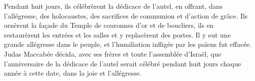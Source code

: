 Pendant huit jours, ils célébrèrent la dédicace de l’autel,
	en offrant, dans l’allégresse, des holocaustes,
		des sacrifices de communion et d’action de grâce.
Ils ornèrent la façade du Temple de couronnes d’or et de boucliers,
	ils en restaurèrent les entrées et les salles et y replacèrent des portes.
Il y eut une grande allégresse dans le peuple,
	et l’humiliation infligée par les païens fut effacée.
Judas Maccabée décida, avec ses frères et toute l’assemblée d’Israël,
	que l’anniversaire de la dédicace de l’autel serait célébré
		pendant huit jours chaque année à cette date, dans la joie et l’allégresse.
